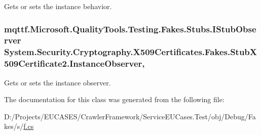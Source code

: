 Gets or sets the instance behavior.

\hypertarget{class_system_1_1_security_1_1_cryptography_1_1_x509_certificates_1_1_fakes_1_1_stub_x509_certificate2_ae8048f9a80283588df6f8d768dc76f4c}{
\subsubsection[{Instance\-Observer}]{\setlength{\rightskip}{0pt plus 5cm}mqttf.\-Microsoft.\-Quality\-Tools.\-Testing.\-Fakes.\-Stubs.\-I\-Stub\-Observer System.\-Security.\-Cryptography.\-X509\-Certificates.\-Fakes.\-Stub\-X509\-Certificate2.\-Instance\-Observer\hspace{0.3cm}{\ttfamily [get]}, {\ttfamily [set]}}}\label{class_system_1_1_security_1_1_cryptography_1_1_x509_certificates_1_1_fakes_1_1_stub_x509_certificate2_ae8048f9a80283588df6f8d768dc76f4c}


Gets or sets the instance observer.



The documentation for this class was generated from the following file\-:\begin{DoxyCompactItemize}
\item 
D\-:/\-Projects/\-E\-U\-C\-A\-S\-E\-S/\-Crawler\-Framework/\-Service\-E\-U\-Cases.\-Test/obj/\-Debug/\-Fakes/s/\hyperlink{s_2f_8cs}{f.\-cs}\end{DoxyCompactItemize}
